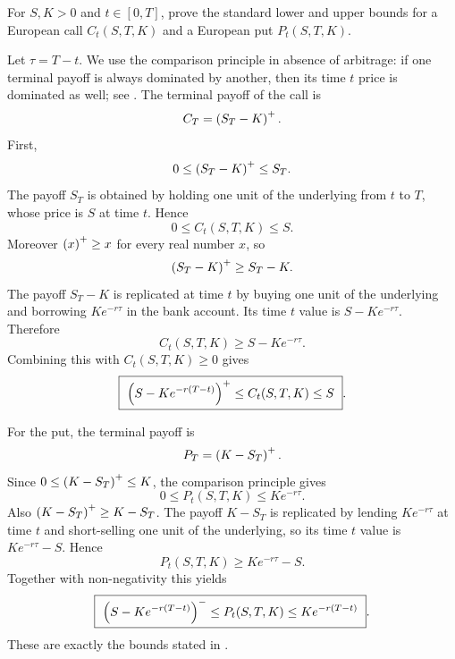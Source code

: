 \begin{exercise}
For \(S,K>0\) and \(t\in[0,T]\), prove the standard lower and upper bounds
for a European call \(C_t(S,T,K)\) and a European put \(P_t(S,T,K)\).
\end{exercise}

\begin{solution}
Let \(\tau=T-t\).  We use the comparison principle in absence of arbitrage:
if one terminal payoff is always dominated by another, then its time \(t\)
price is dominated as well; see .  The
terminal payoff of the call is
\[
  C_T=\left(S_T-K\right)^+.
\]
First,
\[
  0\le \left(S_T-K\right)^+\le S_T.
\]
The payoff \(S_T\) is obtained by holding one unit of the underlying from
\(t\) to \(T\), whose price is \(S\) at time \(t\).  Hence
\[
  0\le C_t(S,T,K)\le S.
\]
Moreover \(\left(x\right)^+\ge x\) for every real number \(x\), so
\[
  \left(S_T-K\right)^+\ge S_T-K.
\]
The payoff \(S_T-K\) is replicated at time \(t\) by buying one unit of the
underlying and borrowing \(Ke^{-r\tau}\) in the bank account.  Its time \(t\)
value is \(S-Ke^{-r\tau}\).  Therefore
\[
  C_t(S,T,K)\ge S-Ke^{-r\tau}.
\]
Combining this with \(C_t(S,T,K)\ge0\) gives
\[
  \boxed{\ \left(S-Ke^{-r(T-t)}\right)^+\le C_t(S,T,K)\le S\ }.
\]

For the put, the terminal payoff is
\[
  P_T=\left(K-S_T\right)^+.
\]
Since \(0\le \left(K-S_T\right)^+\le K\), the comparison principle gives
\[
  0\le P_t(S,T,K)\le Ke^{-r\tau}.
\]
Also \(\left(K-S_T\right)^+\ge K-S_T\).  The payoff \(K-S_T\) is replicated by
lending \(Ke^{-r\tau}\) at time \(t\) and short-selling one unit of the
underlying, so its time \(t\) value is \(Ke^{-r\tau}-S\).  Hence
\[
  P_t(S,T,K)\ge Ke^{-r\tau}-S.
\]
Together with non-negativity this yields
\[
  \boxed{\ \left(S-Ke^{-r(T-t)}\right)^-\le P_t(S,T,K)\le Ke^{-r(T-t)}\ }.
\]
These are exactly the bounds stated in .
\end{solution}
